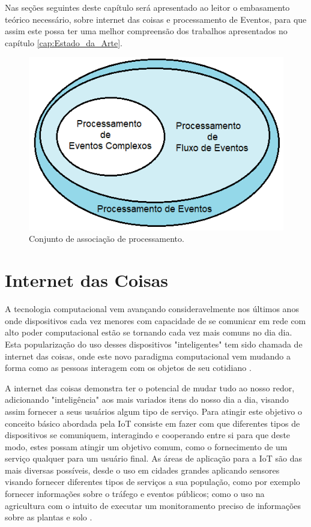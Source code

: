 \documentclass[ti,table]{texufpel} %
\begin{document}
Nas seções seguintes deste capítulo será apresentado ao leitor o embasamento teórico necessário, sobre internet das coisas e processamento de Eventos, para que assim este possa ter uma melhor compreensão dos trabalhos apresentados no capítulo \ref{cap:Estado_da_Arte}.


\begin{figure}[ht]
	\centering
	\includegraphics[width=.6\textwidth]{imagens/ConjuntoProcessamento.png}
	\caption{Conjunto de associação de processamento.}
	\label{fig:ConjuntoProcessamento}
\end{figure}


\section{Internet das Coisas}

A tecnologia computacional vem avançando consideravelmente nos últimos anos onde dispositivos cada vez menores com capacidade de se comunicar em rede com alto poder computacional estão se tornando cada vez mais comuns no dia dia. Esta popularização do uso desses dispositivos "inteligentes" tem sido chamada de internet das coisas, onde este novo paradigma computacional vem mudando a forma como as pessoas interagem com os objetos de seu cotidiano \cite{xavier2016smart}.

A internet das coisas demonstra ter o potencial de mudar tudo ao nosso redor, adicionando "inteligência" aos mais variados itens do nosso dia a dia, visando assim fornecer a seus usuários algum tipo de serviço. Para atingir este objetivo o conceito básico abordada pela IoT consiste em fazer com que diferentes tipos de dispositivos se comuniquem, interagindo e cooperando entre si para que deste modo, estes possam atingir um objetivo comum, como o fornecimento de um serviço qualquer para um usuário final. As áreas de aplicação para a IoT são das mais diversas possíveis, desde o uso em cidades grandes aplicando sensores visando fornecer diferentes tipos de serviços a sua população, como por exemplo fornecer informações sobre o tráfego e eventos públicos; como o uso na agricultura com o intuito de executar um monitoramento preciso de  informações sobre as plantas e solo \cite{gonccalves2017research}.
\end{document}
